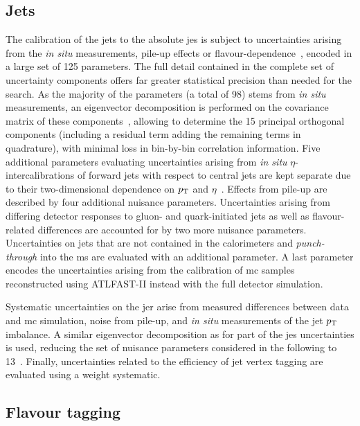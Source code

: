 \subsection{Jets}

The calibration of the jets to the absolute \gls{jes} is subject to uncertainties arising \eg from the \textit{in situ} measurements, pile-up effects or flavour-dependence~\cite{Aad:2020flx}, encoded in a large set of 125 parameters.
The full detail contained in the complete set of uncertainty components offers far greater statistical precision than needed for the \onelepton search.
As the majority of the parameters (a total of 98) stems from \textit{in situ} measurements, an eigenvector decomposition is performed on the covariance matrix of these components~\cite{ATL-PHYS-PUB-2015-014}, allowing to determine the 15 principal orthogonal components (including a residual term adding the remaining terms in quadrature), with minimal loss in bin-by-bin correlation information.
Five additional parameters evaluating uncertainties arising from \textit{in situ} $\eta$-intercalibrations of forward jets with respect to central jets are kept separate due to their two-dimensional dependence on $p_{\textrm{T}}$ and $\eta$~\cite{Aad:2020flx}.
Effects from pile-up are described by four additional nuisance parameters. Uncertainties arising from differing detector responses to gluon- and quark-initiated jets as well as flavour-related differences are accounted for by two more nuisance parameters.
Uncertainties on jets that are not contained in the calorimeters and \textit{punch-through} into the \gls{ms} are evaluated with an additional parameter.
A last parameter encodes the uncertainties arising from the calibration of \gls{mc} samples reconstructed using \textsc{ATLFAST-II} instead with the full detector simulation.

Systematic uncertainties on the \gls{jer} arise from measured differences between data and \gls{mc} simulation, noise from pile-up, and \textit{in situ} measurements of the jet $p_{\textrm{T}}$ imbalance.
A similar eigenvector decomposition as for part of the \gls{jes} uncertainties is used, reducing the set of nuisance parameters considered in the following to 13~\cite{Aad:2020flx}.
Finally, uncertainties related to the efficiency of jet vertex tagging are evaluated using a weight systematic.

\subsection{Flavour tagging}
 
